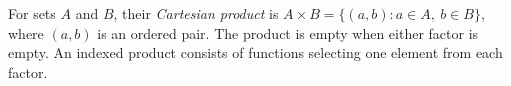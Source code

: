 
For sets $A$ and $B$, their \emph{Cartesian product} is $A\times B=\{(a,b):a\in A,\ b\in B\}$, where $(a,b)$ is an ordered pair. The product is empty when either factor is empty. An indexed product consists of functions selecting one element from each factor.
